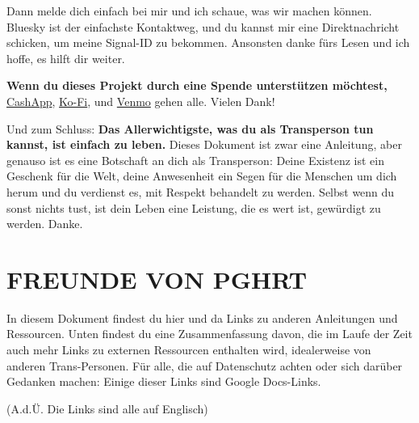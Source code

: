 \documentclass{article}
\begin{document}
Dann melde dich einfach bei mir und ich schaue, was wir machen können. Bluesky ist der einfachste Kontaktweg, und du kannst mir eine Direktnachricht schicken, um meine Signal-ID zu bekommen. Ansonsten danke fürs Lesen und ich hoffe, es hilft dir weiter.

\textbf{Wenn du dieses Projekt durch eine Spende unterstützen möchtest,} \href{https://cash.app/Katitties}{CashApp}, \href{https://ko-fi.com/katitties}{Ko-Fi}, und \href{https://account.venmo.com/u/katitties}{Venmo} gehen alle. Vielen Dank!

Und zum Schluss: \textbf{Das Allerwichtigste, was du als Transperson tun kannst, ist einfach zu leben.} Dieses Dokument ist zwar eine Anleitung, aber genauso ist es eine Botschaft an dich als Transperson: Deine Existenz ist ein Geschenk für die Welt, deine Anwesenheit ein Segen für die Menschen um dich herum und du verdienst es, mit Respekt behandelt zu werden. Selbst wenn du sonst nichts tust, ist dein Leben eine Leistung, die es wert ist, gewürdigt zu werden. Danke.

\section*{FREUNDE VON PGHRT}\label{FOPGHRT}

In diesem Dokument findest du hier und da Links zu anderen Anleitungen und Ressourcen. Unten findest du eine Zusammenfassung davon, die im Laufe der Zeit auch mehr Links zu externen Ressourcen enthalten wird, idealerweise von anderen Trans-Personen. Für alle, die auf Datenschutz achten oder sich darüber Gedanken machen: Einige dieser Links sind Google Docs-Links.

(A.d.Ü. Die Links sind alle auf Englisch)
\end{document}
